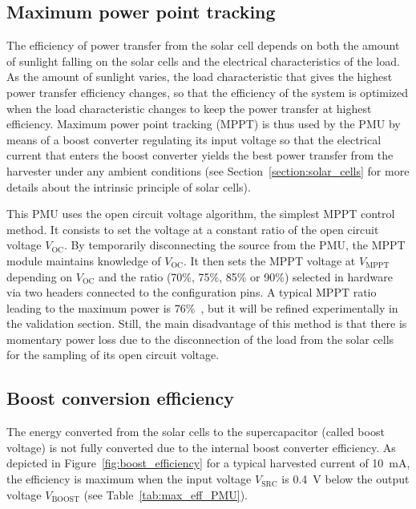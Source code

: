 \documentclass{EPL-master-thesis-covers-EN}
\newcommand{\te}[1]{\textrm{#1}}
\begin{document}
\subsection*{Maximum power point tracking}

The efficiency of power transfer from the solar cell depends on both the amount of sunlight falling on the solar cells and the electrical characteristics of the load. As the amount of sunlight varies, the load characteristic that gives the highest power transfer efficiency changes, so that the efficiency of the system is optimized when the load characteristic changes to keep the power transfer at highest efficiency. 
Maximum power point tracking (MPPT) is thus used by the PMU by means of a boost converter regulating its input voltage so that the electrical current that enters the boost converter yields the best power transfer from the harvester under any ambient conditions (see Section~\ref{section:solar_cells} for more details about the intrinsic principle of solar cells).

This PMU uses the open circuit voltage algorithm, the simplest MPPT control method. It consists to set the voltage at a constant ratio of the open circuit voltage $V_\te{OC}$. By temporarily disconnecting the source from the PMU, the MPPT module maintains knowledge of $V_\te{OC}$. It then sets the MPPT voltage at $V_\te{MPPT}$ depending on $V_\te{OC}$ and the ratio (70\%, 75\%, 85\% or 90\%) selected in hardware via two headers connected to the configuration pins. A typical MPPT ratio leading to the maximum power is 76\%~\cite{10.1109/ICSTE.2010.5608868}, but it will be refined experimentally in the validation section. Still, the main disadvantage of this method is that there is momentary power loss due to the disconnection of the load from the solar cells for the sampling of its open circuit voltage.


\subsection*{Boost conversion efficiency}

The energy converted from the solar cells to the supercapacitor (called boost voltage) is not fully converted due to the internal boost converter efficiency. As depicted in Figure~\ref{fig:boost_efficiency} for a typical harvested current of \SI{10}{mA}, the efficiency is maximum when the input voltage $V_\te{SRC}$ is \SI{0.4}{V} below the output voltage $V_\te{BOOST}$ (see Table~\ref{tab:max_eff_PMU}).
\end{document}
